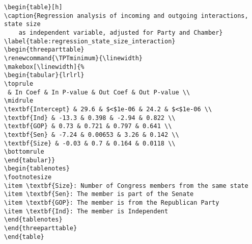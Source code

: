 \documentclass[11pt]{article}
\begin{document}
\begin{Verbatim}[tabsize=4]
\begin{table}[h]
\caption{Regression analysis of incoming and outgoing interactions, state size
	as independent variable, adjusted for Party and Chamber}
\label{table:regression_state_size_interaction}
\begin{threeparttable}
\renewcommand{\TPTminimum}{\linewidth}
\makebox[\linewidth]{%
\begin{tabular}{lrlrl}
\toprule
 & In Coef & In P-value & Out Coef & Out P-value \\
\midrule
\textbf{Intercept} & 29.6 & $<$1e-06 & 24.2 & $<$1e-06 \\
\textbf{Ind} & -13.3 & 0.398 & -2.94 & 0.822 \\
\textbf{GOP} & 0.73 & 0.721 & 0.797 & 0.641 \\
\textbf{Sen} & -7.24 & 0.00653 & 3.26 & 0.142 \\
\textbf{Size} & -0.03 & 0.7 & 0.164 & 0.0118 \\
\bottomrule
\end{tabular}}
\begin{tablenotes}
\footnotesize
\item \textbf{Size}: Number of Congress members from the same state
\item \textbf{Sen}: The member is part of the Senate
\item \textbf{GOP}: The member is from the Republican Party
\item \textbf{Ind}: The member is Independent
\end{tablenotes}
\end{threeparttable}
\end{table}

\end{Verbatim}
\end{document}
